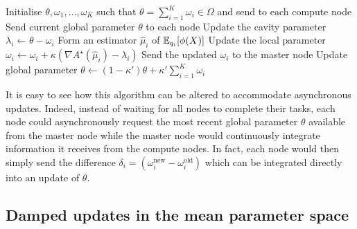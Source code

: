 \begin{algorithm}[!h]\small
	\caption{\label{alg:ep-sms-synch}}
	\begin{algorithmic}[1]
	\State Initialise $\theta,\omega_{1},\dots,\omega_{K}$ such that $\theta=\sum_{i=1}^{K}\omega_{i} \in \Omega$ and send to each compute node
		\State Send current global parameter $\theta$ to each node
			\State Update the cavity parameter $\lambda_{i}\leftarrow\theta-\omega_{i}$
			\State Form an estimator $\hat\mu_{i}$ of $\mathbb E_{q_{i}}[\phi(X)]$
			\State Update the local parameter $\omega_{i}\leftarrow\omega_{i}+\kappa(\nabla A^{\star}(\hat\mu_{i})-\lambda_i)$
			\State Send the updated $\omega_{i}$ to the master node
		\EndFor
		\State Update global parameter $\theta\leftarrow (1-\kappa')\theta + \kappa'\sum_{i=1}^{K}\omega_{i}$
	\EndFor\\	
	\Return{$\theta$}
	\end{algorithmic}
\end{algorithm} 

It is easy to see how this algorithm can be altered to accommodate asynchronous updates. Indeed, instead of waiting for all nodes to complete their tasks, each node could asynchronously request the most recent global parameter $\theta$ available from the master node while the master node would continuously integrate information it receives from the compute nodes. In fact, each node would then simply send the difference $\delta_{i} = (\omega_{i}^{\text{new}}-\omega_{i}^{\text{old}})$ which can be integrated directly into an update of $\theta$. 

\subsection{Damped updates in the mean parameter space}

